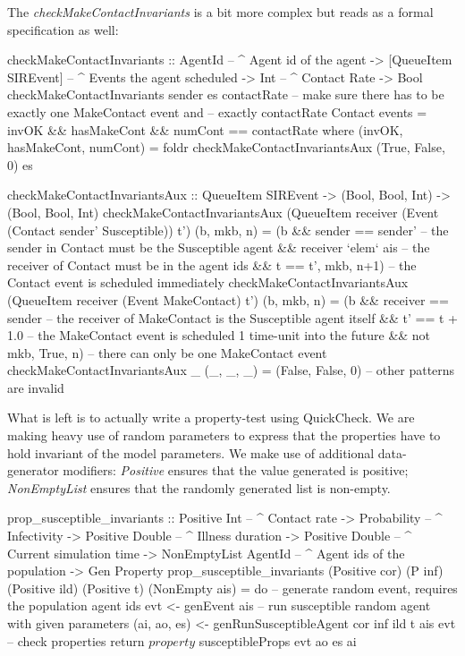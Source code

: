 The \textit{checkMakeContactInvariants} is a bit more complex but reads as a formal specification as well:

\begin{HaskellCode}
checkMakeContactInvariants :: AgentId              -- ^ Agent id of the agent 
                           -> [QueueItem SIREvent] -- ^ Events the agent scheduled
                           -> Int                  -- ^ Contact Rate
                           -> Bool
checkMakeContactInvariants sender es contactRate
    -- make sure there has to be exactly one MakeContact event and
    -- exactly contactRate Contact events
    = invOK && hasMakeCont && numCont == contactRate
  where
    (invOK, hasMakeCont, numCont) 
      = foldr checkMakeContactInvariantsAux (True, False, 0) es

    checkMakeContactInvariantsAux :: QueueItem SIREvent 
                                  -> (Bool, Bool, Int)
                                  -> (Bool, Bool, Int)
    checkMakeContactInvariantsAux 
        (QueueItem receiver (Event (Contact sender' Susceptible)) t') (b, mkb, n)
      = (b && sender == sender'    -- the sender in Contact must be the Susceptible agent
           && receiver `elem` ais  -- the receiver of Contact must be in the agent ids
           && t == t', mkb, n+1)   -- the Contact event is scheduled immediately
    checkMakeContactInvariantsAux 
        (QueueItem receiver (Event MakeContact) t') (b, mkb, n) 
      = (b && receiver == sender   -- the receiver of MakeContact is the Susceptible agent itself
           && t' == t + 1.0        -- the MakeContact event is scheduled 1 time-unit into the future
           &&  not mkb, True, n)   -- there can only be one MakeContact event
    checkMakeContactInvariantsAux _ (_, _, _) 
      = (False, False, 0) -- other patterns are invalid
\end{HaskellCode}

What is left is to actually write a property-test using QuickCheck. We are making heavy use of random parameters to express that the properties have to hold invariant of the model parameters. We make use of additional data-generator modifiers: \textit{Positive} ensures that the value generated is positive; \textit{NonEmptyList} ensures that the randomly generated list is non-empty.

\begin{HaskellCode}
prop_susceptible_invariants :: Positive Int         -- ^ Contact rate
                            -> Probability          -- ^ Infectivity
                            -> Positive Double      -- ^ Illness duration
                            -> Positive Double      -- ^ Current simulation time
                            -> NonEmptyList AgentId -- ^ Agent ids of the population
                            -> Gen Property
prop_susceptible_invariants 
  (Positive cor) (P inf) (Positive ild) (Positive t) (NonEmpty ais) = do
  -- generate random event, requires the population agent ids
  evt <- genEvent ais
  -- run susceptible random agent with given parameters
  (ai, ao, es) <- genRunSusceptibleAgent cor inf ild t ais evt
  -- check properties
  return $ property $ susceptibleProps evt ao es ai
\end{HaskellCode}

